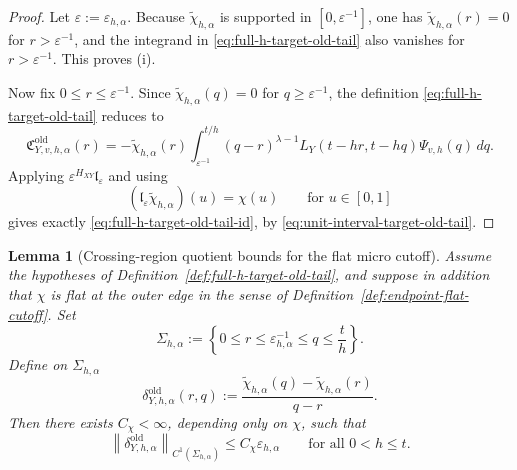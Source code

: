 \documentclass[11pt,a4paper]{amsart}
\theoremstyle{plain}
\newtheorem{lemma}[theorem]{Lemma}
\theoremstyle{definition}
\theoremstyle{remark}
\begin{document}
\begin{proof}
Let \(\varepsilon:=\varepsilon_{h,\alpha}\). Because \(\widetilde\chi_{h,\alpha}\) is supported in
\([0,\varepsilon^{-1}]\), one has \(\widetilde\chi_{h,\alpha}(r)=0\) for \(r>\varepsilon^{-1}\), and
the integrand in \eqref{eq:full-h-target-old-tail} also vanishes for \(r>\varepsilon^{-1}\). This
proves (i).

Now fix \(0\le r\le \varepsilon^{-1}\). Since \(\widetilde\chi_{h,\alpha}(q)=0\) for
\(q\ge\varepsilon^{-1}\), the definition \eqref{eq:full-h-target-old-tail} reduces to
\[
\mathfrak C_{Y,v,h,\alpha}^{\mathrm{old}}(r)
=
-\widetilde\chi_{h,\alpha}(r)
\int_{\varepsilon^{-1}}^{t/h}
(q-r)^{\lambda-1}
L_Y(t-hr,t-hq)\Psi_{v,h}(q)\,dq.
\]
Applying \(\varepsilon^{H_{XY}}\mathfrak l_\varepsilon\) and using
\[
(\mathfrak l_\varepsilon\widetilde\chi_{h,\alpha})(u)=\chi(u)
\qquad\text{for }u\in[0,1]
\]
gives exactly \eqref{eq:full-h-target-old-tail-id}, by
\eqref{eq:unit-interval-target-old-tail}.
\end{proof}

\begin{lemma}[Crossing-region quotient bounds for the flat micro cutoff]
\label{lem:full-h-target-old-tail-quotient}
Assume the hypotheses of Definition~\ref{def:full-h-target-old-tail}, and suppose in addition that
\(\chi\) is flat at the outer edge in the sense of Definition~\ref{def:endpoint-flat-cutoff}. Set
\[
\Sigma_{h,\alpha}
:=
\left\{
0\le r\le \varepsilon_{h,\alpha}^{-1}\le q\le \frac{t}{h}
\right\}.
\]
Define on \(\Sigma_{h,\alpha}\)
\[
\delta_{Y,h,\alpha}^{\mathrm{old}}(r,q)
:=
\frac{
\widetilde\chi_{h,\alpha}(q)-\widetilde\chi_{h,\alpha}(r)
}{q-r}.
\]
Then there exists \(C_\chi<\infty\), depending only on \(\chi\), such that
\begin{equation}\label{eq:full-h-target-old-tail-quotient}
\left\|
\delta_{Y,h,\alpha}^{\mathrm{old}}
\right\|_{C^1(\Sigma_{h,\alpha})}
\le
C_\chi \varepsilon_{h,\alpha}
\qquad\text{for all }0<h\le t.
\end{equation}
\end{lemma}
\end{document}
